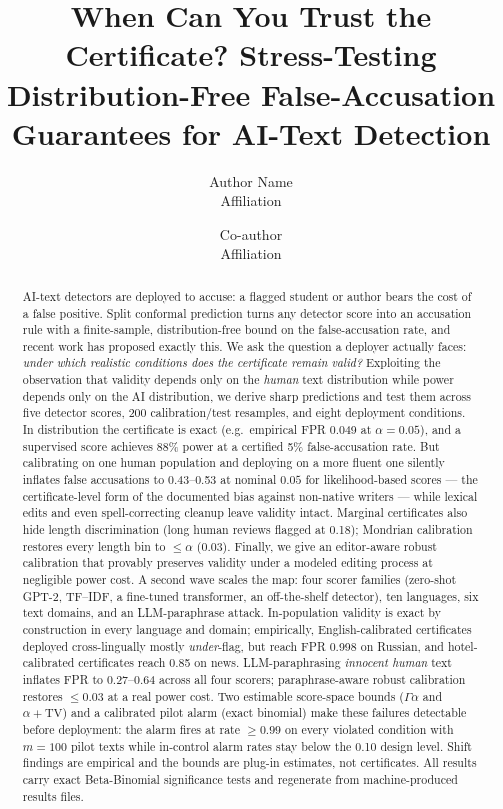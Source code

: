 \documentclass[11pt]{article}
\title{\textbf{When Can You Trust the Certificate? Stress-Testing Distribution-Free False-Accusation Guarantees for AI-Text Detection}}
\author{Author Name\\ \small Affiliation \and Co-author\\ \small Affiliation}
\date{}
\begin{document}
\maketitle
\begin{abstract}
AI-text detectors are deployed to accuse: a flagged student or author bears the cost of a false positive. Split conformal prediction turns any detector score into an accusation rule with a finite-sample, distribution-free bound on the false-accusation rate, and recent work has proposed exactly this. We ask the question a deployer actually faces: \emph{under which realistic conditions does the certificate remain valid?} Exploiting the observation that validity depends only on the \emph{human} text distribution while power depends only on the AI distribution, we derive sharp predictions and test them across five detector scores, 200 calibration/test resamples, and eight deployment conditions. In distribution the certificate is exact (e.g.\ empirical FPR 0.049 at $\alpha=0.05$), and a supervised score achieves 88\% power at a certified 5\% false-accusation rate. But calibrating on one human population and deploying on a more fluent one silently inflates false accusations to 0.43--0.53 at nominal $0.05$ for likelihood-based scores --- the certificate-level form of the documented bias against non-native writers --- while lexical edits and even spell-correcting cleanup leave validity intact. Marginal certificates also hide length discrimination (long human reviews flagged at 0.18); Mondrian calibration restores every length bin to $\le\alpha$ (0.03). Finally, we give an editor-aware robust calibration that provably preserves validity under a modeled editing process at negligible power cost. A second wave scales the map: four scorer families (zero-shot GPT-2, TF--IDF, a fine-tuned transformer, an off-the-shelf detector), ten languages, six text domains, and an LLM-paraphrase attack. In-population validity is exact by construction in every language and domain; empirically, English-calibrated certificates deployed cross-lingually mostly \emph{under}-flag, but reach FPR 0.998 on Russian, and hotel-calibrated certificates reach 0.85 on news. LLM-paraphrasing \emph{innocent human} text inflates FPR to 0.27--0.64 across all four scorers; paraphrase-aware robust calibration restores $\le 0.03$ at a real power cost. Two estimable score-space bounds ($\Gamma\alpha$ and $\alpha+\mathrm{TV}$) and a calibrated pilot alarm (exact binomial) make these failures detectable before deployment: the alarm fires at rate $\ge 0.99$ on every violated condition with $m{=}100$ pilot texts while in-control alarm rates stay below the 0.10 design level. Shift findings are empirical and the bounds are plug-in estimates, not certificates. All results carry exact Beta-Binomial significance tests and regenerate from machine-produced results files.
\end{abstract}
\end{document}

